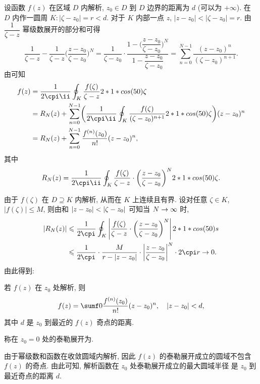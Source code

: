 设函数 $f(z)$ 在区域 $D$ 内解析, $z_0\in D$ 到 $D$ 边界的距离为 $d$ (可以为 $+\infty$).
在 $D$ 内作一圆周 $K:|\zeta-z_0|=r<d$.
对于 $K$ 内部一点 $z$, $|z-z_0|<|\zeta-z_0|=r$.
由 $\dfrac1{\zeta-z}$ 幂级数展开的部分和可得
\[
   \frac1{\zeta-z}-\frac1{\zeta-z}\biggl(\frac{z-z_0}{\zeta-z_0}\biggr)^N
  =\frac1{\zeta-z_0}\cdot\frac{1-\biggl(\dfrac{z-z_0}{\zeta-z_0}\biggr)^N}{1-\dfrac{z-z_0}{\zeta-z_0}}
  =\sum_{n=0}^{N-1}\frac{(z-z_0)^n}{(\zeta-z_0)^{n+1}}.
\]
由\thmCIH 可知
\begin{align*}
   f(z)&
  =\frac1{2\cpi\ii}\oint_K \frac{f(\zeta)}{\zeta-z}\d\zeta\\&
  =R_N(z)+\sum_{n=0}^{N-1}\biggl(\frac1{2\cpi\ii}\oint_K
      \frac{f(\zeta)}{(\zeta-z_0)^{n+1}}\d\zeta
    \biggr)(z-z_0)^n\\&
  =R_N(z)+\sum_{n=0}^{N-1}\frac{f^{(n)}(z_0)}{n!}(z-z_0)^n,
\end{align*}
其中
\[
   R_N(z)
  =\frac1{2\cpi\ii}\oint_K\frac{f(\zeta)}{\zeta-z}\cdot\biggl(\frac{z-z_0}{\zeta-z_0}\biggr)^N\d\zeta.
\]

由于 $f(\zeta)$ 在 $D\supseteq K$ 内解析, 从而在 $K$ 上连续且有界.
设对任意 $\zeta\in K$, $|f(\zeta)|\le M$,
则由\thmGrowUp 和 $\left|z-z_0\right|<\left|\zeta-z_0\right|$ 可知当 $N\rightarrow\infty$ 时,
\begin{align*}
   |R_N(z)|&
  \le\frac 1{2\cpi}\oint_K\abs{\frac{f(\zeta)}{\zeta-z}\cdot\biggl(\frac{z-z_0}{\zeta-z_0}\biggr)^N}\d s\\&
  \le\frac 1{2\cpi}\cdot \frac M{r-|z-z_0|}\cdot\abs{\frac{z-z_0}{\zeta-z_0}}^N\cdot 2\cpi r\ra 0.
\end{align*}
由此得到:

\begin{theorem}
  若 $f(z)$ 在 $z_0$ 处解析, 则
  \[
    f(z)=\sumf0 \frac{f^{(n)}(z_0)}{n!}(z-z_0)^n,
      \quad |z-z_0|<d,
  \]
  其中 $d$ 是 $z_0$ 到最近的 $f(z)$ 奇点的距离.\footnotemark
\end{theorem}

称在 $z_0=0$ 处的泰勒展开为.

由于幂级数和函数在收敛圆域内解析, 因此 $f(z)$ 的泰勒展开成立的圆域不包含 $f(z)$ 的奇点.
由此可知, 解析函数在 $z_0$ 处\alert{泰勒展开成立的最大圆域半径 是 $z_0$ 到最近奇点的距离} $d$.

